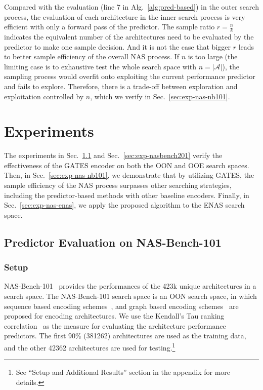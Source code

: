 \documentclass[runningheads]{llncs}
\begin{document}
Compared with the evaluation (line 7 in Alg.~\ref{alg:pred-based}) in the outer search process, the evaluation of each architecture in the inner search process is very efficient with only a forward pass of the predictor.
The sample ratio $r=\frac{n}{k}$ indicates the equivalent number of the architectures need to be evaluated by the predictor to make one sample decision. And it is not the case that bigger $r$ leads to better sample efficiency of the overall NAS process. If $n$ is too large (the limiting case is to exhaustive test the whole search space with $n=|\mathcal{A}|$), the sampling process would overfit onto exploiting the current performance predictor and fails to explore. Therefore, there is a trade-off between exploration and exploitation controlled by $n$, which we verify in Sec.~\ref{sec:exp-nas-nb101}.




\section{Experiments}
\label{sec:exp}
The experiments in Sec.~\ref{sec:exp-nasbench} and Sec.~\ref{sec:exp-nasbench201} verify the effectiveness of the GATES encoder on both the OON and OOE search spaces. 
Then, in Sec.~\ref{sec:exp-nas-nb101}, we demonstrate that by utilizing GATES, the sample efficiency of the NAS process surpasses other searching strategies, including the predictor-based methods with other baseline encoders.
Finally, in Sec.~\ref{sec:exp-nas-enas}, we apply the proposed algorithm to the ENAS search space. 

\subsection{Predictor Evaluation on NAS-Bench-101}
\label{sec:exp-nasbench}

\subsubsection{Setup}
NAS-Bench-101~\cite{ying2019bench} provides the performances of the 423k unique architectures in a search space. The NAS-Bench-101 search space is an OON search space, in which sequence based encoding schemes~\cite{wang2018alphax}, and graph based encoding schemes~\cite{shi2019multi} are proposed for encoding architectures. We use the Kendall's Tau ranking correlation~\cite{sen1968estimates} as the measure for evaluating the architecture performance predictors. The first 90\% (381262) architectures are used as the training data, and the other 42362 architectures are used for testing.\footnote{See ``Setup and Additional Results'' section in the appendix for more details.}
\end{document}
